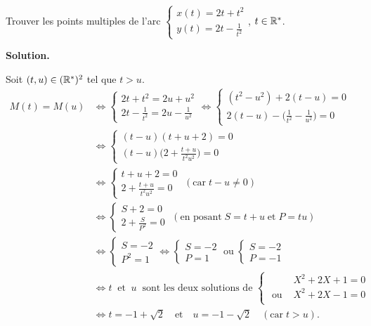\documentclass[class=report,crop=false]{standalone}
\begin{document}
\begin{exemple}
Trouver les points multiples de l'arc
$\left\{
\begin{array}{l}
x(t)=2t+t^2\\
y(t)=2t-\frac{1}{t^2}
\end{array}
\right.$, $t\in\mathbb{R}^*$.


\medskip
\textbf{Solution.}

Soit $(t,u)\in(\mathbb{R}^*)^2$ tel que $t>u$.
\begin{align*}
M(t)=M(u)
&\iff\left\{
\begin{array}{l}
2t+t^2=2u+u^2\\
2t-\frac{1}{t^2}=2u-\frac{1}{u^2}
\end{array}
\right.\iff\left\{
\begin{array}{l}
(t^2-u^2)+2(t-u)=0\\
2(t-u)-\big(\frac{1}{t^2}-\frac{1}{u^2}\big)=0
\end{array}
\right.\\
&\iff\left\{
\begin{array}{l}
(t-u)(t+u+2)=0\\
(t-u)\big(2+\frac{t+u}{t^2u^2}\big)=0
\end{array}
\right.\\
&\iff\left\{
\begin{array}{l}
t+u+2=0\\
2+\frac{t+u}{t^2u^2}=0
\end{array}
\right.\;(\text{car}\;t-u\neq0) \\
&\iff\left\{
\begin{array}{l}
S+2=0\\
2+\frac{S}{P^2}=0
\end{array}
\right.\;(\text{en posant}\;S=t+u\;\text{et}\;P=tu)
\\
 &\iff\left\{
\begin{array}{l}
S=-2\\
P^2=1
\end{array}
\right.\iff\left\{
\begin{array}{l}
S=-2\\
P=1
\end{array}
\right.\;\text{ou}\;\left\{
\begin{array}{l}
S=-2\\
P=-1
\end{array}
\right.
\\
 &\iff t\ \text{ et }\ u\ \text{ sont les deux solutions de }
 \left\{\begin{array}{ll}
  & X^2+2X+1=0 \\
  \text{ ou } & X^2+2X-1=0 \\
\end{array}\right.
\\
 &\iff t=-1+\sqrt{2}\quad\text{et}\quad u=-1-\sqrt{2}\quad(\text{car}\;t>u).
\end{align*}





\end{exemple}
\end{document}
